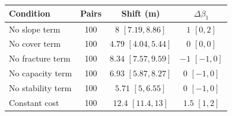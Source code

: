 \begin{tabularx}{\columnwidth}{@{}Yccc@{}}
\toprule
Condition & Pairs & Shift (m) & $\Delta\beta_1$ \\
\midrule
No slope term & 100 &  &  \\
No cover term & 100 &  &  \\
No fracture term & 100 &  &  \\
No capacity term & 100 &  &  \\
No stability term & 100 &  &  \\
Constant cost & 100 &  &  \\
\bottomrule
\end{tabularx}
